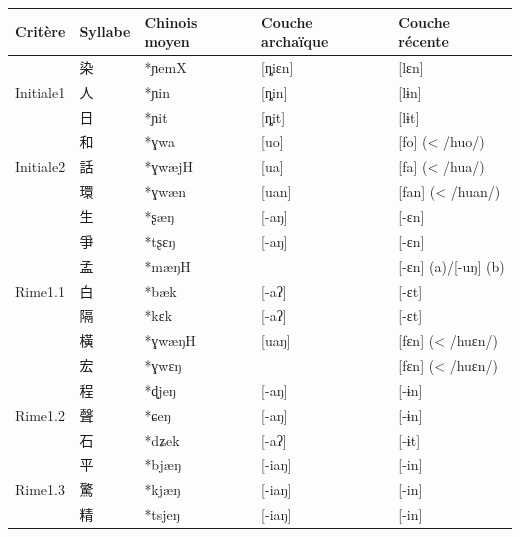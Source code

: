 \documentclass{scrbook}
\newcounter{c}[subsubsection]
\begin{document}
\begin{sloppypar}
\begin{table}[htbp]
  \centering
    \begin{tabular}{llllr}
    \toprule
    Critère & Syllabe & Chinois moyen  & Couche archaïque & \multicolumn{1}{l}{Couche récente} \\
    \midrule
    \multirow{3}[2]{*}{Initiale1} & 染     & *ɲemX & [ȵiɛn] & \multicolumn{1}{l}{[lɛn]} \\
          & 人     & *ɲin  & [ȵin] & \multicolumn{1}{l}{[lɨn]} \\
          & 日     & *ɲit  & [ȵit] & \multicolumn{1}{l}{[lɨt]} \\
    \midrule
    \multirow{3}[2]{*}{Initiale2} & 和     & *ɣwa  & [uo]  & \multicolumn{1}{l}{[fo] (< /huo/)} \\
          & 話     & *ɣwæjH & [ua]  & \multicolumn{1}{l}{[fa] (< /hua/)} \\
          & 環     & *ɣwæn & [uan] & \multicolumn{1}{l}{[fan] (< /huan/)} \\
    \midrule
    \multirow{7}[2]{*}{Rime1.1} & 生     & *ʂæŋ  & [-aŋ] & \multicolumn{1}{l}{[-ɛn]} \\
          & 爭     & *tʂɛŋ & [-aŋ] & \multicolumn{1}{l}{[-ɛn]} \\
          & 孟     & *mæŋH &       & \multicolumn{1}{l}{[-ɛn] (a)/[-uŋ] (b)} \\
          & 白     & *bæk  & [-aʔ] & \multicolumn{1}{l}{[-ɛt]} \\
          & 隔     & *kɛk  & [-aʔ] & \multicolumn{1}{l}{[-ɛt]} \\
          & 橫     & *ɣwæŋH & [uaŋ] & \multicolumn{1}{l}{[fɛn] (< /huɛn/)} \\
          & 宏     & *ɣwɛŋ &       & \multicolumn{1}{l}{[fɛn] (< /huɛn/)} \\
    \midrule
    \multirow{3}[2]{*}{Rime1.2} & 程     & *ɖjeŋ & [-aŋ] & \multicolumn{1}{l}{[-ɨn]} \\
          & 聲     & *ɕeŋ  & [-aŋ] & \multicolumn{1}{l}{[-ɨn]} \\
          & 石     & *dʑek & [-aʔ] & \multicolumn{1}{l}{[-ɨt]} \\
    \midrule
    \multirow{9}[2]{*}{Rime1.3} & 平     & *bjæŋ & [-iaŋ] & \multicolumn{1}{l}{[-in]} \\
          & 驚     & *kjæŋ & [-iaŋ] & \multicolumn{1}{l}{[-in]} \\
          & 精     & *tsjeŋ & [-iaŋ] & \multicolumn{1}{l}{[-in]} \\

\end{tabular}
\end{table}
\end{sloppypar}
\end{document}
